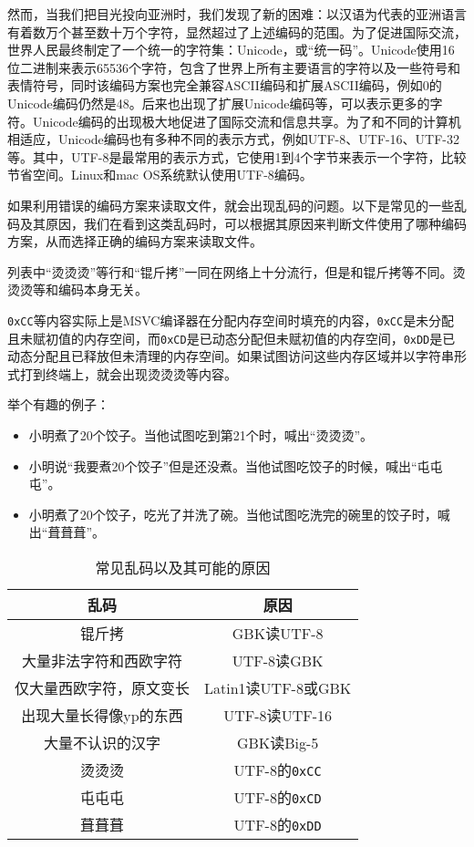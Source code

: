 然而，当我们把目光投向亚洲时，我们发现了新的困难：以汉语为代表的亚洲语言有着数万个甚至数十万个字符，显然超过了上述编码的范围。为了促进国际交流，世界人民最终制定了一个统一的字符集：Unicode，或“统一码”。Unicode使用16位二进制来表示65536个字符，包含了世界上所有主要语言的字符以及一些符号和表情符号，同时该编码方案也完全兼容ASCII编码和扩展ASCII编码，例如0的Unicode编码仍然是48。后来也出现了扩展Unicode编码等，可以表示更多的字符。Unicode编码的出现极大地促进了国际交流和信息共享。为了和不同的计算机相适应，Unicode编码也有多种不同的表示方式，例如UTF-8、UTF-16、UTF-32等。其中，UTF-8是最常用的表示方式，它使用1到4个字节来表示一个字符，比较节省空间。Linux和mac OS系统默认使用UTF-8编码。

如果利用错误的编码方案来读取文件，就会出现乱码的问题。以下是常见的一些乱码及其原因，我们在看到这类乱码时，可以根据其原因来判断文件使用了哪种编码方案，从而选择正确的编码方案来读取文件。

\begin{note}
  列表中“烫烫烫”等行和“锟斤拷”一同在网络上十分流行，但是和锟斤拷等不同。烫烫烫等和编码本身无关。
  
  \texttt{0xCC}等内容实际上是MSVC编译器在分配内存空间时填充的内容，\texttt{0xCC}是未分配且未赋初值的内存空间，而\texttt{0xCD}是已动态分配但未赋初值的内存空间，\texttt{0xDD}是已动态分配且已释放但未清理的内存空间。如果试图访问这些内存区域并以字符串形式打到终端上，就会出现烫烫烫等内容。

  举个有趣的例子：
  \begin{itemize}
    \item 小明煮了20个饺子。当他试图吃到第21个时，喊出“烫烫烫”。
    \item 小明说“我要煮20个饺子”但是还没煮。当他试图吃饺子的时候，喊出“屯屯屯”。
    \item 小明煮了20个饺子，吃光了并洗了碗。当他试图吃洗完的碗里的饺子时，喊出“葺葺葺”。
  \end{itemize}
\end{note}

\begin{table}[ht]
  \centering
  \caption{常见乱码以及其可能的原因}
  \begin{tabular}{c|c}
    \toprule
    乱码 & 原因 \\
    \midrule
    锟斤拷 & GBK读UTF-8 \\
    大量非法字符和西欧字符 & UTF-8读GBK \\
    仅大量西欧字符，原文变长 & Latin1读UTF-8或GBK \\
    出现大量长得像yp的东西 & UTF-8读UTF-16 \\
    大量不认识的汉字 & GBK读Big-5 \\
    \midrule
    烫烫烫 & UTF-8的\texttt{0xCC}\\
    屯屯屯 & UTF-8的\texttt{0xCD}\\
    葺葺葺 & UTF-8的\texttt{0xDD}\\
    \bottomrule
  \end{tabular}
\end{table}

